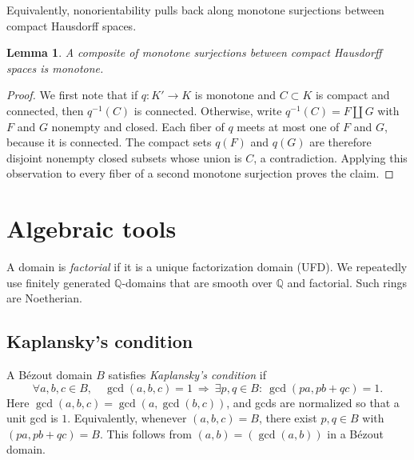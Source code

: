\documentclass[11pt]{amsart}
\numberwithin{equation}{section}
\newtheorem{lemma}[theorem]{Lemma}
\theoremstyle{definition}
\newcommand{\Q}{\mathbb{Q}}
\begin{document}
Equivalently, nonorientability pulls back along monotone surjections between compact Hausdorff spaces.

\begin{lemma}\label{lem:monotone-composition}
A composite of monotone surjections between compact Hausdorff spaces is monotone.
\end{lemma}

\begin{proof}
We first note that if $q:K'\to K$ is monotone and $C\subset K$ is compact and connected, then $q^{-1}(C)$ is connected. Otherwise, write $q^{-1}(C)=F\amalg G$ with $F$ and $G$ nonempty and closed. Each fiber of $q$ meets at most one of $F$ and $G$, because it is connected. The compact sets $q(F)$ and $q(G)$ are therefore disjoint nonempty closed subsets whose union is $C$, a contradiction. Applying this observation to every fiber of a second monotone surjection proves the claim.
\end{proof}

\section{Algebraic tools}\label{sec:tools}

A domain is \emph{factorial} if it is a unique factorization domain (UFD). We repeatedly use finitely generated $\Q$-domains that are smooth over $\Q$ and factorial. Such rings are Noetherian.

\subsection{Kaplansky's condition}\label{subsec:kaplansky}

A B\'ezout domain $B$ satisfies \emph{Kaplansky's condition} \cite{Kaplansky} if
\[
  \forall a,b,c\in B,\quad \gcd(a,b,c)=1
  \ \Longrightarrow\
  \exists p,q\in B:\ \gcd(pa,pb+qc)=1.
\]
Here $\gcd(a,b,c)=\gcd(a,\gcd(b,c))$, and gcds are normalized so that a unit gcd is $1$. Equivalently, whenever $(a,b,c)=B$, there exist $p,q\in B$ with $(pa,pb+qc)=B$. This follows from $(a,b)=(\gcd(a,b))$ in a B\'ezout domain.
\end{document}
